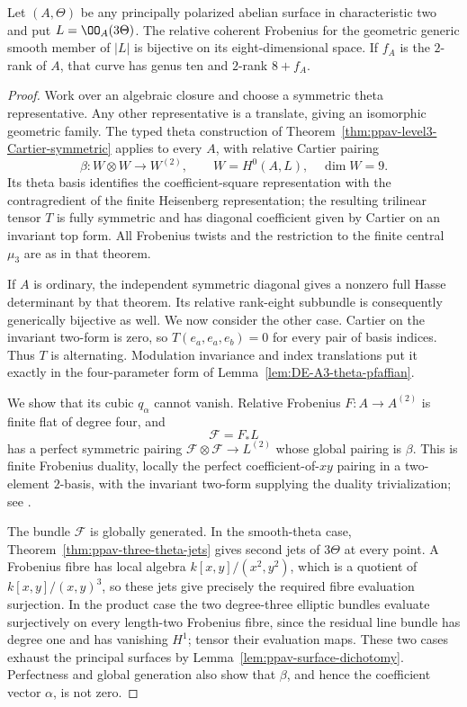 \begin{proposition}
\label{prop:DE-A3-ppav-degree-one}
Let $(A,\Theta)$ be any principally polarized abelian surface in
characteristic two and put $L=\OO_A(3\Theta)$.  The relative coherent
Frobenius for the geometric generic smooth member of $|L|$ is bijective
on its eight-dimensional space.  If $f_A$ is the $2$-rank of $A$, that
curve has genus ten and $2$-rank $8+f_A$.
\end{proposition}
\begin{proof}
Work over an algebraic closure and choose a symmetric theta
representative.  Any other representative is a translate, giving an
isomorphic geometric family.  The typed theta construction of
Theorem~\ref{thm:ppav-level3-Cartier-symmetric} applies to every $A$,
with relative Cartier pairing
\[
 \beta:W\otimes W\longrightarrow W^{(2)},\qquad
 W=H^0(A,L),\quad\dim W=9.
\]
Its theta basis identifies the coefficient-square representation with
the contragredient of the finite Heisenberg representation; the resulting
trilinear tensor $T$ is fully symmetric and has diagonal coefficient
given by Cartier on an invariant top form.  All Frobenius twists and
the restriction to the finite central $\mu_3$ are as in that theorem.

If $A$ is ordinary, the independent symmetric diagonal gives a nonzero
full Hasse determinant by that theorem.  Its relative rank-eight
subbundle is consequently generically bijective as well.  We now
consider the other case.  Cartier on the invariant two-form is zero,
so $T(e_a,e_a,e_b)=0$ for every pair of basis indices.  Thus $T$ is
alternating.  Modulation invariance and index translations put it
exactly in the four-parameter form of
Lemma~\ref{lem:DE-A3-theta-pfaffian}.

We show that its cubic $q_\alpha$ cannot vanish.  Relative Frobenius
$F:A\to A^{(2)}$ is finite flat of degree four, and
\[
                 \mathcal F=F_*L
\]
has a perfect symmetric pairing
$\mathcal F\otimes\mathcal F\to L^{(2)}$ whose global pairing is
$\beta$.  This is finite Frobenius duality, locally the perfect
coefficient-of-$xy$ pairing in a two-element $2$-basis, with the
invariant two-form supplying the duality trivialization; see
\cite[Lemma~1.3.6, Proposition~1.3.7 and Theorem~1.3.8,
pp.~26--28]{BrionKumar2005}.

The bundle $\mathcal F$ is globally generated.  In the smooth-theta
case, Theorem~\ref{thm:ppav-three-theta-jets} gives second jets of
$3\Theta$ at every point.  A Frobenius fibre has local algebra
$k[x,y]/(x^2,y^2)$, which is a quotient of
$k[x,y]/(x,y)^3$, so these jets give precisely the required fibre
evaluation surjection.  In the product case the two degree-three
elliptic bundles evaluate surjectively on every length-two Frobenius
fibre, since the residual line bundle has degree one and has vanishing
$H^1$; tensor their evaluation maps.  These two cases exhaust the
principal surfaces by Lemma~\ref{lem:ppav-surface-dichotomy}.
Perfectness and global generation also show that $\beta$, and hence
the coefficient vector $\alpha$, is not zero.


\end{proof}
